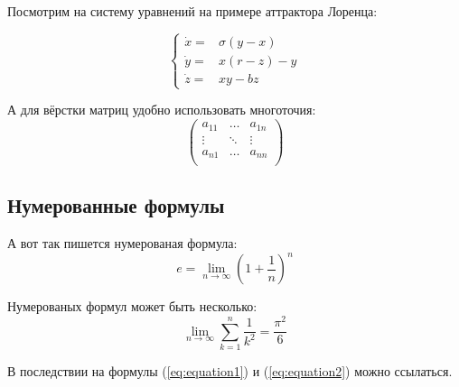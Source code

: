 Посмотрим на систему уравнений на примере аттрактора Лоренца:

$$
\left\{
  \begin{array}{rl}
    \dot x = & \sigma (y-x) \\
    \dot y = & x (r - z) - y \\
    \dot z = & xy - bz
  \end{array}
\right.
$$

А для вёрстки матриц удобно использовать многоточия:
$$
\left(
  \begin{array}{ccc}
  	a_{11} & \ldots & a_{1n} \\
  	\vdots & \ddots & \vdots \\
  	a_{n1} & \ldots & a_{nn} \\
  \end{array}
\right)
$$


\subsection{Нумерованные формулы} \label{subsect1_4_3}

А вот так пишется нумерованая формула:
\begin{equation}
  \label{eq:equation1}
  e = \lim_{n \to \infty} \left( 1+\frac{1}{n} \right) ^n
\end{equation}

Нумерованых формул может быть несколько:
\begin{equation}
  \label{eq:equation2}
  \lim_{n \to \infty} \sum_{k=1}^n \frac{1}{k^2} = \frac{\pi^2}{6}
\end{equation}

В последствии на формулы (\ref{eq:equation1}) и (\ref{eq:equation2}) можно ссылаться.


\clearpage

